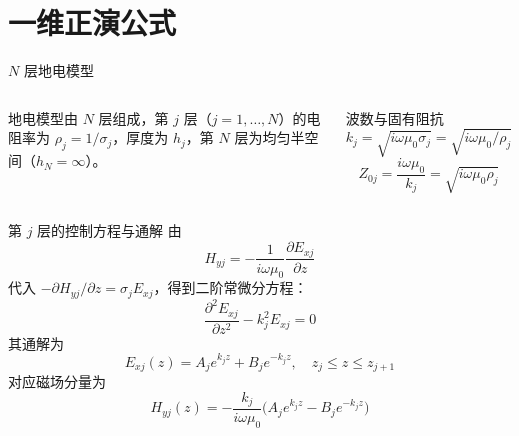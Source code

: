 \documentclass[10pt,aspectratio=169,fontset=none]{ctexbeamer}
\begin{document}
    \section{一维正演公式}

    \begin{frame}{$N$ 层地电模型}
        \begin{columns}
            地电模型由 $N$ 层组成，第 $j$ 层（$j=1,\dots,N$）的电阻率为 $\rho_j=1/\sigma_j$，厚度为 $h_j$，第 $N$ 层为均匀半空间（$h_N=\infty$）。

            \begin{block}{波数与固有阻抗}
                \begin{equation*}
                    k_j = \sqrt{i\omega \mu_0 \sigma_j} = \sqrt{i\omega \mu_0 / \rho_j}
                \end{equation*}
                \begin{equation*}
                    Z_{0j} = \frac{i\omega\mu_0}{k_j} = \sqrt{i\omega \mu_0 \rho_j}
                \end{equation*}
            \end{block}
        \end{columns}
    \end{frame}

    \begin{frame}{第 $j$ 层的控制方程与通解}
        由
        \begin{equation}
            H_{yj} = -\frac{1}{i\omega \mu_0}\frac{\partial E_{xj}}{\partial z}
        \end{equation}
        代入 $-\partial H_{yj}/\partial z=\sigma_j E_{xj}$，得到二阶常微分方程：
        \begin{equation}
            \frac{\partial^2 E_{xj}}{\partial z^2} - k_j^2 E_{xj} = 0
        \end{equation}
        其通解为
        \begin{equation}
            E_{xj}(z) = A_j e^{k_j z} + B_j e^{-k_j z},\quad z_j\le z\le z_{j+1}
        \end{equation}
        对应磁场分量为
        \begin{equation}
            H_{yj}(z) = -\frac{k_j}{i\omega \mu_0}\bigl(A_j e^{k_j z} - B_j e^{-k_j z}\bigr)
        \end{equation}
    \end{frame}
\end{document}
